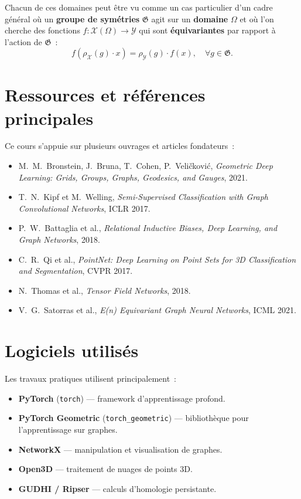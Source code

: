 \begin{remarque}[Unification]
Chacun de ces domaines peut \^etre vu comme un cas particulier d'un cadre g\'en\'eral
o\`u un \textbf{groupe de sym\'etries} $\mathfrak{G}$ agit sur un \textbf{domaine}
$\Omega$ et o\`u l'on cherche des fonctions $f: \mathcal{X}(\Omega) \to \mathcal{Y}$
qui sont \textbf{\'equivariantes} par rapport \`a l'action de $\mathfrak{G}$~:
\[
    f(\rho_{\mathcal{X}}(g) \cdot x) = \rho_{\mathcal{Y}}(g) \cdot f(x),
    \quad \forall g \in \mathfrak{G}.
\]
\end{remarque}

\section*{Ressources et r\'ef\'erences principales}

Ce cours s'appuie sur plusieurs ouvrages et articles fondateurs~:
\begin{itemize}
    \item M.~M.~Bronstein, J.~Bruna, T.~Cohen, P.~Veli\v{c}kovi\'c,
          \textit{Geometric Deep Learning: Grids, Groups, Graphs, Geodesics,
          and Gauges}, 2021.
    \item T.~N.~Kipf et M.~Welling, \textit{Semi-Supervised Classification with
          Graph Convolutional Networks}, ICLR 2017.
    \item P.~W.~Battaglia et al., \textit{Relational Inductive Biases, Deep
          Learning, and Graph Networks}, 2018.
    \item C.~R.~Qi et al., \textit{PointNet: Deep Learning on Point Sets for
          3D Classification and Segmentation}, CVPR 2017.
    \item N.~Thomas et al., \textit{Tensor Field Networks}, 2018.
    \item V.~G.~Satorras et al., \textit{E(n) Equivariant Graph Neural Networks},
          ICML 2021.
\end{itemize}

\section*{Logiciels utilis\'es}

Les travaux pratiques utilisent principalement~:
\begin{itemize}
    \item \textbf{PyTorch} (\texttt{torch}) --- framework d'apprentissage profond.
    \item \textbf{PyTorch Geometric} (\texttt{torch\_geometric}) --- biblioth\`eque pour
          l'apprentissage sur graphes.
    \item \textbf{NetworkX} --- manipulation et visualisation de graphes.
    \item \textbf{Open3D} --- traitement de nuages de points 3D.
    \item \textbf{GUDHI / Ripser} --- calculs d'homologie persistante.
\end{itemize}


